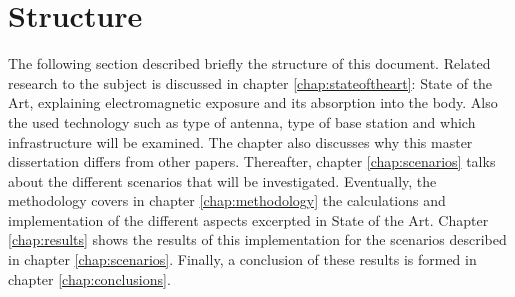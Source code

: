 \section{Structure}
\label{sec:structure}
The following section described briefly the structure of this document. Related research to the subject is discussed in chapter \ref{chap:stateoftheart}: State of the Art, explaining
electromagnetic exposure and its absorption into the body. Also the used technology such as type of antenna, type of base station and 
which infrastructure will be examined. The chapter also discusses why this master dissertation differs from other papers.
Thereafter, chapter \ref{chap:scenarios} talks about the different scenarios that will be investigated. 
Eventually, the methodology covers in chapter \ref{chap:methodology} the calculations and implementation of the different aspects excerpted in State of the Art.
Chapter \ref{chap:results} shows the results of this 
implementation for the scenarios described in chapter \ref{chap:scenarios}. 
Finally, a conclusion of these results is formed in chapter \ref{chap:conclusions}.


